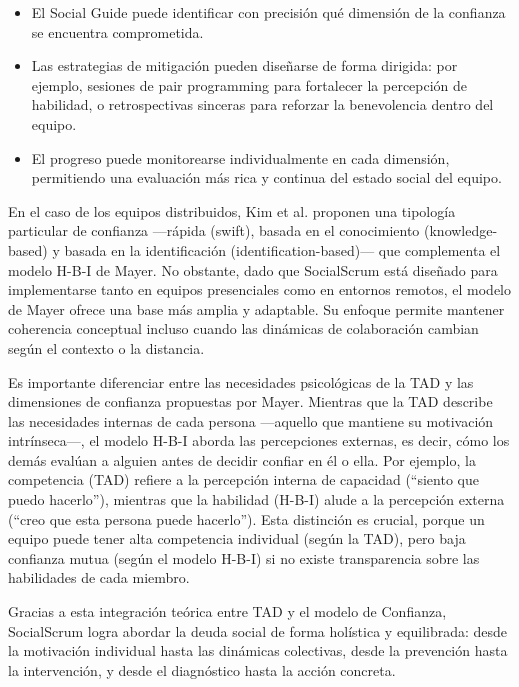 \begin{itemize}
    \item El Social Guide puede identificar con precisión qué dimensión de la confianza se encuentra comprometida.
    \item Las estrategias de mitigación pueden diseñarse de forma dirigida: por ejemplo, sesiones de pair programming para fortalecer la percepción de habilidad, o retrospectivas sinceras para reforzar la benevolencia dentro del equipo.
    \item El progreso puede monitorearse individualmente en cada dimensión, permitiendo una evaluación más rica y continua del estado social del equipo.
\end{itemize}

En el caso de los equipos distribuidos, Kim et al. \cite{kim2009individual} proponen una tipología particular de confianza —rápida (swift), basada en el conocimiento (knowledge-based) y basada en la identificación (identification-based)— que complementa el modelo H-B-I de Mayer.
No obstante, dado que SocialScrum está diseñado para implementarse tanto en equipos presenciales como en entornos remotos, el modelo de Mayer ofrece una base más amplia y adaptable. Su enfoque permite mantener coherencia conceptual incluso cuando las dinámicas de colaboración cambian según el contexto o la distancia.

Es importante diferenciar entre las necesidades psicológicas de la TAD y las dimensiones de confianza propuestas por Mayer.
Mientras que la TAD describe las necesidades internas de cada persona —aquello que mantiene su motivación intrínseca—, el modelo H-B-I aborda las percepciones externas, es decir, cómo los demás evalúan a alguien antes de decidir confiar en él o ella. Por ejemplo, la competencia (TAD) refiere a la percepción interna de capacidad (``siento que puedo hacerlo''), mientras que la habilidad (H-B-I) alude a la percepción externa (``creo que esta persona puede hacerlo''). Esta distinción es crucial, porque un equipo puede tener alta competencia individual (según la TAD), pero baja confianza mutua (según el modelo H-B-I) si no existe transparencia sobre las habilidades de cada miembro.

Gracias a esta integración teórica entre TAD y el modelo de Confianza, SocialScrum logra abordar la deuda social de forma holística y equilibrada: desde la motivación individual hasta las dinámicas colectivas, desde la prevención hasta la intervención, y desde el diagnóstico hasta la acción concreta.

